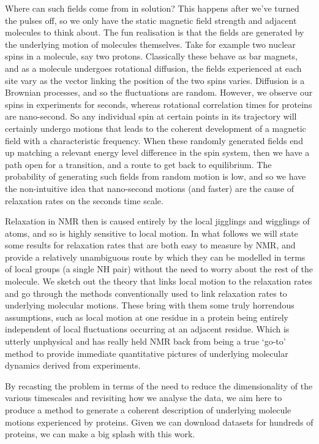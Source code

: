\documentclass[showkeys,aps,prb,prepreint,amssymb, amsmath,nobibnotes]{article}
\begin{document}
  Where can such fields come from in solution? This happens after we've turned the pulses off, so we only have the static magnetic field strength and adjacent molecules to think about. The fun realisation is that the fields are generated by the underlying motion of molecules themselves. Take for example two nuclear spins in a molecule, say two protons. Classically these behave as bar magnets, and as a molecule undergoes rotational diffusion, the fields experienced at each site vary as the vector linking the position of the two spins varies. Diffusion is a Brownian processes, and so the fluctuations are random. However, we observe our spins in experiments for seconds, whereas rotational correlation times for proteins are nano-second. So any individual spin at certain points in its trajectory will certainly undergo motions that leads to the coherent development of a magnetic field with a characteristic frequency. When these randomly generated fields end up matching a relevant energy level difference in the spin system, then we have a path open for a transition, and a route to get back to equilibrium. The probability of generating such fields from random motion is low, and so we have the non-intuitive idea that nano-second motions (and faster) are the cause of relaxation rates on the seconds time scale. 
 
  Relaxation in NMR then is caused entirely by the local jigglings and wigglings of atoms, and so is highly sensitive to local motion. In what follows we will state some results for relaxation rates that are both easy to measure by NMR, and provide a relatively unambiguous route by which they can be modelled in terms of local groups (a single NH pair) without the need to worry about the rest of the molecule. We sketch out the theory that links local motion to the relaxation rates and go through the methods conventionally used to link relaxation rates to underlying molecular motions. These bring with them some truly horrendous assumptions, such as local motion at one residue in a protein being entirely independent of local fluctuations occurring at an adjacent residue. Which is utterly unphysical and has really held NMR back from being a true `go-to' method to provide immediate quantitative pictures of underlying molecular dynamics derived from experiments.

  By recasting the problem in terms of the need to reduce the dimensionality of the various timescales and revisiting how we analyse the data, we aim here to produce a method to generate a coherent description of underlying molecule motions experienced by proteins. Given we can download datasets for hundreds of proteins, we can make a big splash with this work.
  
\end{document}
